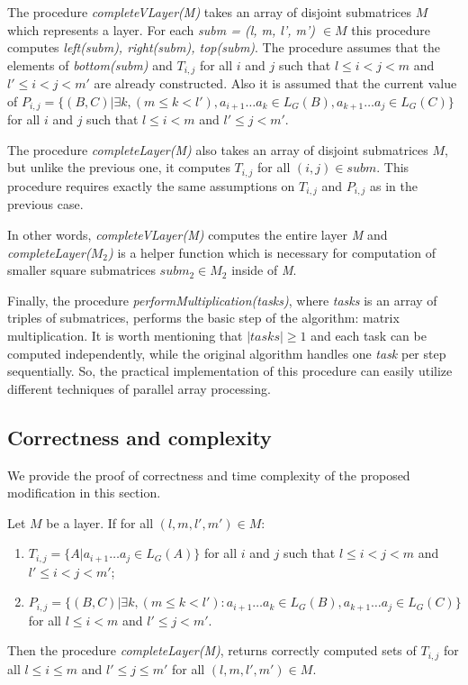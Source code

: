 The procedure \textit{completeVLayer(M)} takes an array of disjoint submatrices $M$ which represents a layer.
For each \textit{subm = (l, m, l', m') $\in M$} this procedure computes \textit{left(subm), right(subm), top(subm)}.
The procedure assumes that the elements of \textit{bottom(subm)} and $T_{i, j}$ for all $i$ and $j$ such that $l \leq i < j < m$ and $  l' \leq i < j < m'$ are already constructed.
Also it is assumed that the current value of
$P_{i, j} =  \{ (B, C) | \exists k, (m \le k < l'), a_{i + 1} \dots a_{k} \in L_G(B), a_{k + 1} \dots a_{j} \in L_G(C)\} $ for all $i$ and $j$ such that $l \leq i < m$ and $l' \leq j < m'$.

The procedure \textit{completeLayer(M)} also takes an array of disjoint submatrices $M$, but unlike the previous one, it computes $T_{i, j}$ for all $(i, j) \in subm$.
This procedure requires exactly the same assumptions on $T_{i, j}$  and $P_{i, j}$  as in the previous case.

In other words, \textit{completeVLayer(M)} computes the entire layer \textit{M} \linebreak and \textit{completeLayer($M_{2}$)} is a helper function which is necessary for computation of smaller square submatrices $subm_{2} \in M_{2}$ inside of \textit{M}.

Finally, the procedure \textit{performMultiplication(tasks)}, where \textit{tasks} is an array of triples of submatrices, performs the basic step of the algorithm: matrix multiplication.
It is worth mentioning that $|tasks| \ge 1$ and each task can be computed independently, while the original algorithm handles one \textit{task} per step sequentially.
So, the practical implementation of this procedure can easily utilize different techniques of parallel array processing.

\subsection{Correctness and complexity}

We provide the proof of correctness and time complexity of the proposed modification in this section.

\begin{lemma}
Let $M$ be a layer. If for all $(l, m, l', m') \in M$:
\begin{enumerate}
  \item $T_{i, j} = \{ A |  a_{i + 1} \dots a_{j} \in L_G(A)\}$ for all $i$ and $j$ such that $l \leq i < j < m$ and $l' \leq i < j < m'$;
  \item $P_{i, j} =  \{ (B, C) |\exists k, (m \le k < l'): a_{i + 1} \dots a_{k} \in L_G(B), a_{k + 1} \dots a_{j} \in L_G(C)\}$ for all $l \leq i < m$ and $l' \leq j < m'$.
\end{enumerate}

Then the procedure \textit{completeLayer(M)}, returns correctly computed sets of $T_{i, j}$ for all $l \leq i \le m$ and $l' \leq j \le m'$ for all $(l, m, l', m') \in M$.
\end{lemma}

